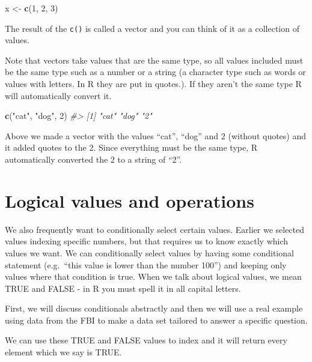 \documentclass[
  12pt,
]{book}
\newenvironment{Shaded}{\begin{snugshade}}{\end{snugshade}}
\newcommand{\CommentTok}[1]{\textcolor[rgb]{0.37,0.37,0.37}{\textit{#1}}}
\newcommand{\DecValTok}[1]{\textcolor[rgb]{0.06,0.06,0.06}{#1}}
\newcommand{\KeywordTok}[1]{\textcolor[rgb]{0.27,0.27,0.27}{\textbf{#1}}}
\newcommand{\NormalTok}[1]{#1}
\newcommand{\StringTok}[1]{\textcolor[rgb]{0.5,0.5,0.5}{#1}}
\begin{document}
\begin{Shaded}
\begin{Highlighting}[]
\NormalTok{x <{-}}\StringTok{ }\KeywordTok{c}\NormalTok{(}\DecValTok{1}\NormalTok{, }\DecValTok{2}\NormalTok{, }\DecValTok{3}\NormalTok{)}
\end{Highlighting}
\end{Shaded}

The result of the \texttt{c()} is called a vector and you can think of it as a collection of values.

Note that vectors take values that are the same type, so all values included must be the same type such as a number or a string (a character type such as words or values with letters. In R they are put in quotes.). If they aren't the same type R will automatically convert it.

\begin{Shaded}
\begin{Highlighting}[]
\KeywordTok{c}\NormalTok{(}\StringTok{"cat"}\NormalTok{, }\StringTok{"dog"}\NormalTok{, }\DecValTok{2}\NormalTok{)}
\CommentTok{\#> [1] "cat" "dog" "2"}
\end{Highlighting}
\end{Shaded}

Above we made a vector with the values ``cat'', ``dog'' and 2 (without quotes) and it added quotes to the 2. Since everything must be the same type, R automatically converted the 2 to a string of ``2''.

\hypertarget{logical-values-and-operations}{%
\section{Logical values and operations}\label{logical-values-and-operations}}

We also frequently want to conditionally select certain values. Earlier we selected values indexing specific numbers, but that requires us to know exactly which values we want. We can conditionally select values by having some conditional statement (e.g.~``this value is lower than the number 100'') and keeping only values where that condition is true. When we talk about logical values, we mean TRUE and FALSE - in R you must spell it in all capital letters.

First, we will discuss conditionals abstractly and then we will use a real example using data from the FBI to make a data set tailored to answer a specific question.

We can use these TRUE and FALSE values to index and it will return every element which we say is TRUE.
\end{document}
